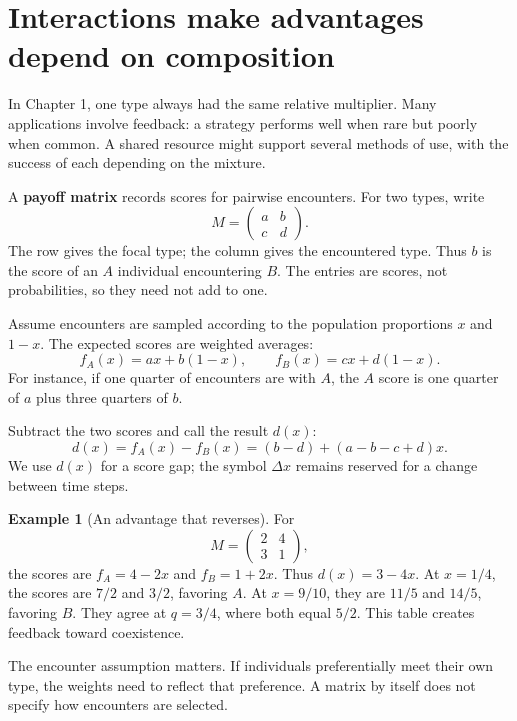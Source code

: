 \documentclass[11pt,oneside,openany]{book}
\theoremstyle{definition}
\newtheorem{example}{Example}[chapter]
\theoremstyle{remark}
\numberwithin{equation}{chapter}
\begin{document}
\section{Interactions make advantages depend on composition}\label{ch02-interactions-make-advantages-depend-on-composition}

In Chapter 1, one type always had the same relative multiplier. Many applications involve feedback: a strategy performs well when rare but poorly when common. A shared resource might support several methods of use, with the success of each depending on the mixture.

A \textbf{payoff matrix} records scores for pairwise encounters. For two types, write \[M=\begin{pmatrix}a&b\\c&d\end{pmatrix}.\] The row gives the focal type; the column gives the encountered type. Thus \(b\) is the score of an \(A\) individual encountering \(B\). The entries are scores, not probabilities, so they need not add to one.

Assume encounters are sampled according to the population proportions \(x\) and \(1-x\). The expected scores are weighted averages: \[f_A(x)=ax+b(1-x),\qquad f_B(x)=cx+d(1-x).\] For instance, if one quarter of encounters are with \(A\), the \(A\) score is one quarter of \(a\) plus three quarters of \(b\).

Subtract the two scores and call the result \(d(x)\): \[d(x)=f_A(x)-f_B(x)=(b-d)+(a-b-c+d)x.\] We use \(d(x)\) for a score gap; the symbol \(\Delta x\) remains reserved for a change between time steps.

\begin{example}[An advantage that reverses]

For \[M=\begin{pmatrix}2&4\\3&1\end{pmatrix},\] the scores are \(f_A=4-2x\) and \(f_B=1+2x\). Thus \(d(x)=3-4x\). At \(x=1/4\), the scores are \(7/2\) and \(3/2\), favoring \(A\). At \(x=9/10\), they are \(11/5\) and \(14/5\), favoring \(B\). They agree at \(q=3/4\), where both equal \(5/2\). This table creates feedback toward coexistence.

\end{example}

The encounter assumption matters. If individuals preferentially meet their own type, the weights need to reflect that preference. A matrix by itself does not specify how encounters are selected.
\end{document}
